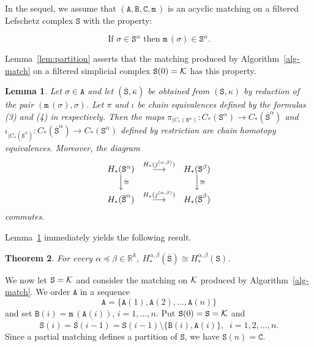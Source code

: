 \documentclass[12pt]{article}
\newtheorem{thm}{Theorem}[section]
\newtheorem{lem}[thm]{Lemma}
\newcommand{\R}{{\mathbb R}}
\newcommand{\cK}{{\cal K}}
\def\mapright#1{\stackrel{#1}{\longrightarrow}}
\def\mapdown#1{\Big\downarrow\rlap{$\vcenter{\hbox{$\scriptstyle#1$}}$}}
\newcommand{\ma}{\texttt{m}\,} \newcommand{\re}{\texttt{r}\,}
\newcommand{\sS}{\texttt{S}} \newcommand{\sA}{\texttt{A}}
\newcommand{\sB}{\texttt{B}}
\newcommand{\sC}{\texttt{C}} \newcommand{\sD}{\texttt{D}} \newcommand{\sM}{\texttt{M}} \newcommand{\sL}{\texttt{L}}
\begin{document}
In the sequel, we assume that $(\sA,\sB,\sC,\ma)$ is an acyclic matching on a filtered Lefschetz complex $\sS$ with the property:

\begin{equation}\label{matching-filtration}
\mbox{If } \sigma\in\sS^\alpha \mbox{ then } \ma(\sigma)\in \sS^\alpha.
\end{equation}

Lemma~\ref{lem:partition} asserts that the matching produced by Algorithm~\ref{alg-match} on a filtered simplicial complex $\sS(0)=\cK$ has this property.

\begin{lem}\label{lem:chain-equivalence} Let $\sigma\in \sA$ and let $(\overline{\sS}, \overline{\kappa})$ be obtained from $(\sS,\kappa)$ by reduction of the pair $(\ma(\sigma),\sigma)$.
Let $\pi$ and $\iota$ be chain equivalences defined by the formulas (3) and (4) in \cite{AlKaLa17} respectively.
Then the maps $\pi_{|C_*(\sS^\alpha)}:C_*(\sS^\alpha)\to C_*(\overline{\sS}^\alpha)$ and
$\iota_{|C_*(\overline{\sS}^\alpha)}:C_*(\overline{\sS}^\alpha)\to C_*(\sS^\alpha)$ defined by restriction are chain homotopy equivalences.
Moreover, the diagram
\[
\begin{array}{ccc}
H_*(\sS^\alpha) & \mapright{H_*(j^{(\alpha,\beta)})} & H_*(\sS^\beta) \\
\mapdown{\cong} & & \mapdown{\cong} \\
H_*(\overline{\sS}^\alpha) & \mapright{H_*(j^{(\alpha,\beta)})} & H_*(\overline{\sS}^\beta)
\end{array}
\]
commutes.
\end{lem}

Lemma~\ref{lem:chain-equivalence} immediately yields the following result.

\begin{thm}\label{th:reduced-filtration-iso}
For every $\alpha\preceq \beta\in \R^k$, $H_*^{\alpha,\beta}(\overline{\sS}) \cong H_*^{\alpha,\beta}(\sS)$.
\end{thm}

We now let $\sS=\cK$ and consider the matching on $\cK$ produced by Algorithm~\ref{alg-match}. We order $\sA$ in a sequence
\[
\sA=\{\sA(1),\sA(2),\ldots,\sA(n)\}
\]
and set $\sB(i)=\ma(\sA(i))$, $i=1,\ldots,n$. Put $\sS(0)=\sS=\cK$ and
\[
\sS(i)=\overline{\sS(i-1)}=\sS(i-1)\setminus \{\sB(i),\sA(i)\},\;\;i=1,2,\ldots,n.
\]
Since a partial matching defines a partition of $\sS$, we have $\sS(n)=\sC$.
\end{document}
